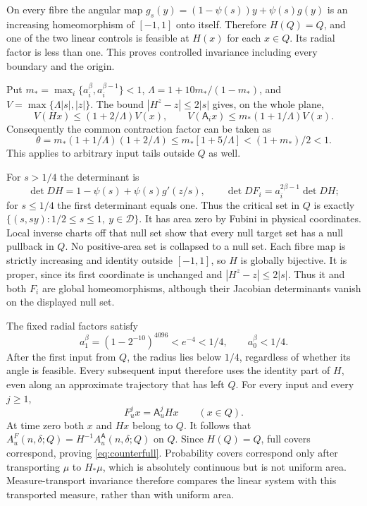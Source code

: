 \documentclass[11pt]{amsart}
\theoremstyle{definition}
\theoremstyle{remark}
\numberwithin{equation}{section}
\begin{document}
On every fibre the angular map
$g_s(y)=(1-\psi(s))y+\psi(s)g(y)$ is an increasing homeomorphism
of $[-1,1]$ onto itself. Therefore $H(Q)=Q$, and one of the
two linear controls is feasible at $H(x)$ for each $x\in Q$.
Its radial factor is less than one. This proves controlled invariance
including every boundary and the origin.

Put $m_* =\max_i\{a_i^\beta,a_i^{\beta-1}\}<1$,
$\Lambda=1+10m_* /(1-m_*)$, and $V=\max\{\Lambda|s|,|z|\}$.
The bound $|H^z-z|\le2|s|$ gives, on the whole plane,
\[
V(Hx)\le(1+2/\Lambda)V(x),\qquad
V(\mathsf A_i x)\le m_*(1+1/\Lambda)V(x).
\]
Consequently the common contraction factor can be taken as
\[
\theta=m_*(1+1/\Lambda)(1+2/\Lambda)
 \le m_*[1+5/\Lambda]<(1+m_*)/2<1.
\]
This applies to arbitrary input tails outside $Q$ as well.

For $s>1/4$ the determinant is
\[
\det DH=1-\psi(s)+\psi(s)g'(z/s),\qquad
\det DF_i=a_i^{2\beta-1}\det DH;
\]
for $s\le1/4$ the first determinant equals one.
Thus the critical set in $Q$ is exactly
$\{(s,sy):1/2\le s\le1,\ y\in\mathcal D\}$.
It has area zero by Fubini in physical coordinates. Local inverse
charts off that null set show that every null target set has a null
pullback in $Q$. No positive-area set is collapsed to a null set.
Each fibre map is strictly increasing and identity outside $[-1,1]$,
so $H$ is globally bijective. It is proper, since its first coordinate
is unchanged and $|H^z-z|\le2|s|$. Thus it and both $F_i$ are
global homeomorphisms, although their Jacobian determinants vanish
on the displayed null set.

The fixed radial factors satisfy
\[
a_1^\beta=(1-2^{-10})^{4096}<e^{-4}<1/4,
\qquad a_0^\beta<1/4.
\]
After the first input from $Q$, the radius lies below $1/4$,
regardless of whether its angle is feasible. Every subsequent input
therefore uses the identity part of $H$, even along an approximate
trajectory that has left $Q$. For every input and every $j\ge1$,
\begin{equation}\label{eq:onetransient}
F_u^j x=\mathsf A_u^j Hx\qquad(x\in Q).
\end{equation}
At time zero both $x$ and $Hx$ belong to $Q$. It follows that
$A_u^F(n,\delta;Q)=H^{-1}A_u^{\mathsf A}(n,\delta;Q)$ on $Q$.
Since $H(Q)=Q$, full covers correspond, proving
\eqref{eq:counterfull}. Probability covers correspond only after
transporting $\mu$ to $H_*\mu$, which is absolutely continuous
but is not uniform area. Measure-transport invariance therefore
compares the linear system with this transported measure, rather
than with uniform area.
\end{document}
